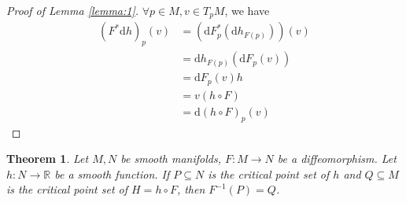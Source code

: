 \documentclass{article}
\newtheorem{theorem}{Theorem}
\begin{document}
\begin{proof}[Proof of Lemma \ref{lemma:1}]
  $\forall p \in M ,v \in T_p M$, we have
$$
\begin{aligned}
  \left(F^* \mathrm{d} h\right)_p(v) &=\left(\mathrm{d} F_p^*\left(\mathrm{d} h_{F(p)}\right)\right)(v) \\
  &=\mathrm{d} h_{F(p)}\left(\mathrm{d} F_p(v)\right) \\
  &=\mathrm{d} F_p(v) h \\
&=v(h \circ F) \\
  &=\mathrm{d}(h \circ F)_p(v)
\end{aligned}
$$
\end{proof}



\begin{theorem}
  \label{theorem:1}
  Let $M, N$ be smooth manifolds, $F: M\rightarrow N$ be a diffeomorphism. Let $h: N\rightarrow \mathbb{R}$ be a smooth function.
  If $P \subseteq N$ is the critical point set of $h$ and $Q \subseteq M$ is the critical point set of $H = h \circ F$, then $F^{-1}(P) = Q$.
\end{theorem}
\end{document}
